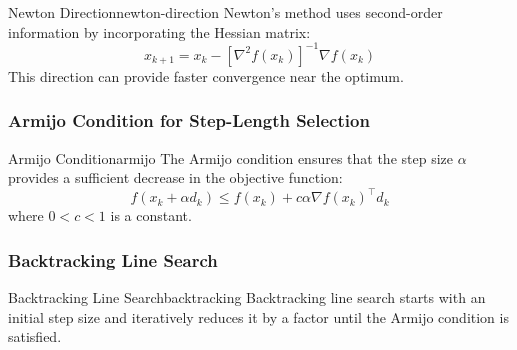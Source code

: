 \begin{definition}{Newton Direction}{newton-direction}
Newton's method uses second-order information by incorporating the Hessian matrix:
\[
x_{k+1} = x_k - [\nabla^2 f(x_k)]^{-1} \nabla f(x_k)
\]
This direction can provide faster convergence near the optimum.
\end{definition}

\subsubsection*{Armijo Condition for Step-Length Selection}

\begin{definition}{Armijo Condition}{armijo}
The Armijo condition ensures that the step size \( \alpha \) provides a sufficient decrease in the objective function:
\[
f(x_k + \alpha d_k) \leq f(x_k) + c \alpha \nabla f(x_k)^\top d_k
\]
where \( 0 < c < 1 \) is a constant.
\end{definition}

\subsubsection*{Backtracking Line Search}

\begin{definition}{Backtracking Line Search}{backtracking}
Backtracking line search starts with an initial step size and iteratively reduces it by a factor until the Armijo condition is satisfied.

\end{definition}

\begin{algorithm}[H]
\caption{Backtracking Line Search}
\label{alg:backtracking}
\;
\KwRet{$\alpha$}\;
\end{algorithm}